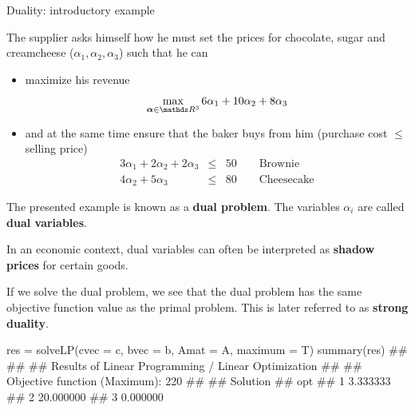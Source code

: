 \begin{vbframe}{Duality: introductory example}
\lz

The supplier asks himself how he must set the prices for chocolate, sugar and creamcheese ($\alpha_1, \alpha_2, \alpha_3$) such that he can

\begin{itemize}
\item maximize his revenue
$$
\max_{\bm{\alpha} \in \R^3}6 \alpha_1 + 10 \alpha_2 + 8 \alpha_3
$$
\item and at the same time ensure that the baker buys from him (purchase cost $\le$ selling price)
\begin{eqnarray*}
3\alpha_1 + 2\alpha_2 + 2\alpha_3 &\le& 50 \qquad \text{Brownie} \\
4\alpha_2 + 5\alpha_3 &\le& 80 \qquad \text{Cheesecake}
\end{eqnarray*}

\end{itemize}

\framebreak

The presented example is known as a \textbf{dual problem}. The variables $\alpha_i$ are called \textbf{dual variables}.

\lz

In an economic context, dual variables can often be interpreted as \textbf{shadow prices} for certain goods.

\lz

If we solve the dual problem, we see that the dual problem has the same objective function value as the primal problem. This is later referred to as \textbf{strong duality}.

%
\framebreak
\footnotesize
\begin{verbbox}
res = solveLP(cvec = c, bvec = b, Amat = A, maximum = T)
summary(res)
##
##
## Results of Linear Programming / Linear Optimization
##
## Objective function (Maximum): 220
##
## Solution
## opt
## 1 3.333333
## 2 20.000000
## 3 0.000000
\end{verbbox}
\col





\end{vbframe}
